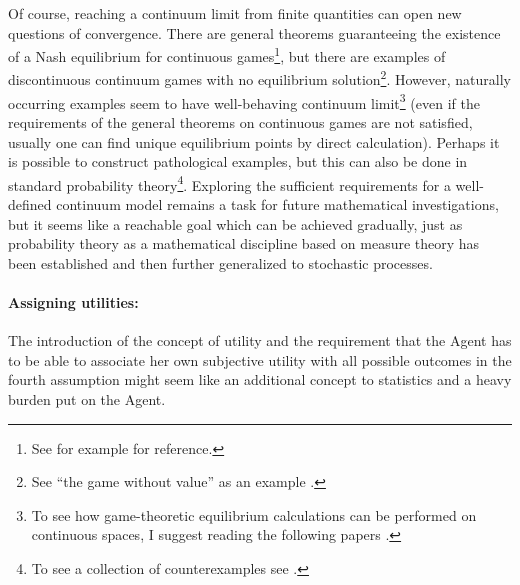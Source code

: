 \documentclass{article}
\begin{document}
Of course, reaching a continuum limit from finite quantities can open new questions of convergence. There are general theorems guaranteeing the existence of a Nash equilibrium for continuous games\footnote{See for example \cite{paper:ContinuousEquilibrium,paper:SeparableGames} for reference.}, but there are examples of discontinuous continuum games with no equilibrium solution\footnote{See ``the game without value'' as an example \cite{paper:DiscontinuousGames}.}.
However, naturally occurring examples seem to have well-behaving continuum limit\footnote{To see how game-theoretic equilibrium calculations can be performed on continuous spaces, I suggest reading the following papers \cite{Kashyap1971,Kashyap1974,paper:Abbott2018,paper:Abbott2023}.} (even if the requirements of the general theorems on continuous games are not satisfied, usually one can find unique equilibrium points by direct calculation).
Perhaps it is possible to construct pathological examples, but this can also be done in standard probability theory\footnote{To see a collection of counterexamples see \cite{book:CounterexamplesInProbability,book:CounterexamplesInProbabilityAndRealAnalysis,book:CounterexamplesInProbabilityAndStatistics}.}.
Exploring the sufficient requirements for a well-defined continuum model remains a task for future mathematical investigations, but it seems like a reachable goal which can be achieved gradually, just as probability theory as a mathematical discipline based on measure theory has been established and then further generalized to stochastic processes.




\paragraph{Assigning utilities:}
The introduction of the concept of utility and the requirement that the Agent has to be able to associate her own subjective utility with all possible outcomes in the fourth assumption might seem like an additional concept to statistics and a heavy burden put on the Agent.
\end{document}
